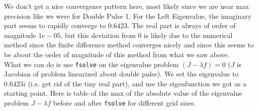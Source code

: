 \documentclass[12pt]{article}
\begin{document}
We don't get a nice convergence pattern here, most likely since we are near max precision like we were for Double Pulse 1. For the Left Eigenvalue, the imaginary part seems to rapidly converge to 0.6423. The real part is always of order of magnitude $1e-05$, but this deviation from 0 is likely due to the numerical method since the finite difference method converges nicely and since this seems to be about the order of magnitude of this method from what we saw above.\\

What we can do is use \texttt{fsolve} on the eigenvalue problem $(J -\lambda f) = 0$ ($J$ is Jacobian of problem linearized about double pulse). We set the eigenvalue to $0.6423i$ (i.e. get rid of the tiny real part), and use the eigenfunction we got as a starting point. Here is table of the max of the absolute value of the eigenvalue problem $J -\lambda f$ before and after \texttt{fsolve} for different grid sizes.
\end{document}
